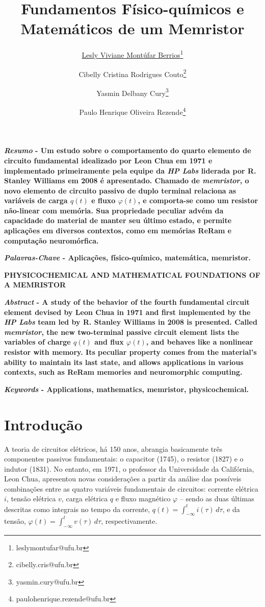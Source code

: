 \documentclass{ceel}
\title{Fundamentos Físico-químicos e Matemáticos de um Memristor}
\author[1]{\underline{Lesly Viviane Montúfar Berrios}\thanks{leslymontufar@ufu.br}}
\author[1]{Cibelly Cristina Rodrigues Couto\thanks{cibelly.cris@ufu.br}}
\author[1]{Yasmin Delbany Cury\thanks{yasmin.cury@ufu.br}}
\author[2]{Paulo Henrique Oliveira Rezende\thanks{paulohenrique.rezende@ufu.br}}
\affil[1]{FEELT - Universidade Federal de Uberlândia}
\affil[2]{FEELT - Professor Adjunto - Universidade Federal de Uberlândia}
\begin{document}
\inserirtitulo

\begin{multicols}{2}

\textbf{\emph{Resumo} - Um estudo sobre o comportamento do quarto elemento de circuito fundamental idealizado por Leon Chua em 1971 e implementado primeiramente pela equipe da \emph{HP Labs} liderada por R. Stanley Williams em 2008 é apresentado. Chamado de \emph{memristor}, o novo elemento de circuito passivo de duplo terminal relaciona as variáveis de carga $q(t)$ e fluxo $\varphi(t)$, e comporta-se como um resistor não-linear com memória. Sua propriedade peculiar advém da capacidade do material de manter seu último estado, e permite aplicações em diversos contextos, como em memórias ReRam e computação neuromórfica.} %
\vspace*{10pt}

\textbf{\emph{Palavras-Chave} - Aplicações, físico-químico, matemática, memristor.}


\begin{center}

\noindent\textbf{\large \uppercase{Physicochemical and Mathematical Foundations of a Memristor}}
\end{center}

\textbf{\emph{Abstract} - A study of the behavior of the fourth fundamental circuit element devised by Leon Chua in 1971 and first implemented by the \emph{HP Labs} team led by R. Stanley Williams in 2008 is presented. Called \emph {memristor}, the new two-terminal passive circuit element lists the variables of charge $q(t)$ and flux $\varphi(t)$, and behaves like a nonlinear resistor with memory. Its peculiar property comes from the material's ability to maintain its last state, and allows applications in various contexts, such as ReRam memories and neuromorphic computing.}
\vspace*{10pt}

\textbf{\emph{Keywords} - Applications, mathematics, memristor, physicochemical.}


\section{Introdução}
A teoria de circuitos elétricos, há 150 anos, abrangia basicamente três componentes passivos fundamentais: o capacitor (1745), o resistor (1827) e o indutor (1831). No entanto, em 1971, o professor da Universidade da Califórnia, Leon Chua, apresentou novas considerações a partir da análise das possíveis combinações entre as quatro variáveis fundamentais de circuitos: corrente elétrica $i$, tensão elétrica $v$, carga elétrica $q$ e fluxo magnético $\varphi$ – sendo as duas últimas descritas como integrais no tempo da corrente, $q(t)=\int_{-\infty}^t i(\tau)\, d\tau$, e da tensão, $\varphi(t)=\int_{-\infty}^t v(\tau)\, d\tau$, respectivamente.


\end{multicols}
\end{document}
